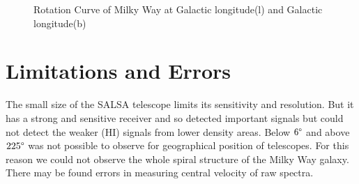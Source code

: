 \documentclass[conference]{IEEEtran}
\begin{document}
\begin{figure}[!t]
{\label{fig_sixth_case}}
\hfil
{}
\hfil
{}
\hfil
\caption{Rotation Curve of Milky Way at Galactic longitude(l) and Galactic longitude(b)}
\label{fig:rot}
\end{figure}

\section{Limitations and Errors}

The small size of the SALSA telescope limits its sensitivity and resolution. But it has a strong and sensitive receiver and so detected important signals but could not detect the weaker (HI) signals from lower density areas. Below $6\degree$ and above $225\degree$ was not possible to observe for geographical position of telescopes. For this reason we could not observe the whole spiral structure of the Milky Way galaxy. There may be found errors in measuring central velocity of raw spectra\cite{CathyHorellou2015,santo2013mapping}.
\end{document}
